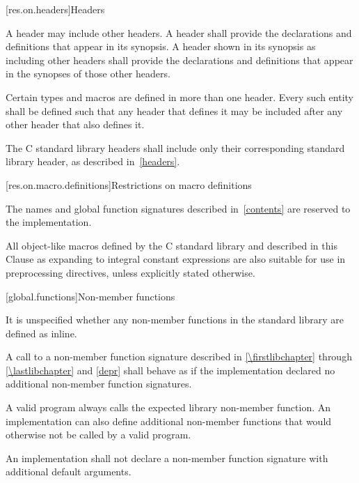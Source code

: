 [res.on.headers]{Headers}

\pnum
A \Cpp{} header may include other \Cpp{} headers.
A \Cpp{} header shall provide the declarations and definitions that appear in its
synopsis. A \Cpp{} header shown in its synopsis as including other \Cpp{} headers
shall provide the declarations and definitions that appear in the synopses of
those other headers.

\pnum
Certain types and macros are defined in more than one header.
Every such entity shall be defined such that any header that defines it may be
included after any other header that also defines it.

\pnum
The C standard library headers
shall include only their corresponding \Cpp{} standard library header,
as described in~\ref{headers}.

[res.on.macro.definitions]{Restrictions on macro definitions}
%

\pnum
The names and global function signatures described in~\ref{contents} are
reserved to the implementation.
%
%
%
%
%

\pnum
All object-like macros defined by the C standard library and described in this
Clause as expanding to integral constant expressions are also suitable for use
in  preprocessing directives, unless
explicitly stated otherwise.

[global.functions]{Non-member functions}

\pnum
It is unspecified whether any
non-member
functions in the \Cpp{} standard library are defined as
inline.

\pnum
A call to a non-member function signature
described in \ref{\firstlibchapter} through \ref{\lastlibchapter} and
\ref{depr} shall behave as if the implementation declared no additional
non-member function signatures.
\begin{footnote}
A valid \Cpp{} program always
calls the expected library non-member function. An implementation can
also define additional non-member functions that would otherwise not
be called by a valid \Cpp{} program.
\end{footnote}

\pnum
An implementation shall not declare a non-member function signature
with additional default arguments.


